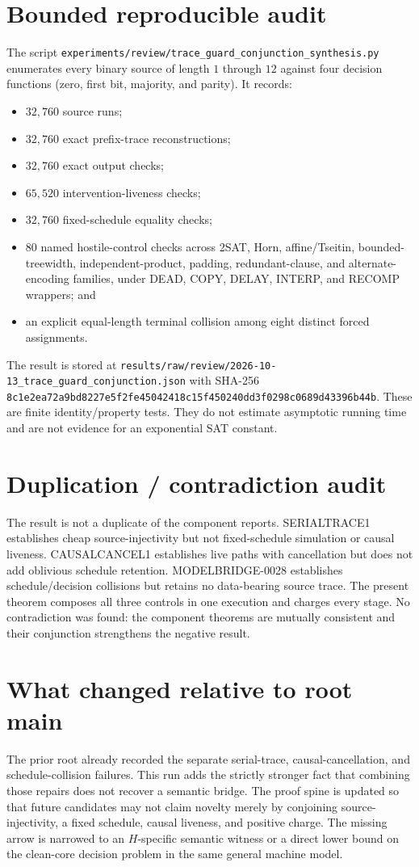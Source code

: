 \documentclass[11pt]{article}
\begin{document}
\section*{Bounded reproducible audit}
The script
\texttt{experiments/review/trace\_guard\_conjunction\_synthesis.py}
enumerates every binary source of length $1$ through $12$ against four
decision functions (zero, first bit, majority, and parity).  It records:
\begin{itemize}
\item $32{,}760$ source runs;
\item $32{,}760$ exact prefix-trace reconstructions;
\item $32{,}760$ exact output checks;
\item $65{,}520$ intervention-liveness checks;
\item $32{,}760$ fixed-schedule equality checks;
\item $80$ named hostile-control checks across 2SAT, Horn, affine/Tseitin,
bounded-treewidth, independent-product, padding, redundant-clause, and
alternate-encoding families, under DEAD, COPY, DELAY, INTERP, and RECOMP
wrappers; and
\item an explicit equal-length terminal collision among eight distinct forced
assignments.
\end{itemize}
The result is stored at
\texttt{results/raw/review/2026-10-13\_trace\_guard\_conjunction.json} with
SHA-256
\texttt{8c1e2ea72a9bd8227e5f2fe45042418c15f450240dd3f0298c0689d43396b44b}.
These are finite identity/property tests.  They do not estimate asymptotic
running time and are not evidence for an exponential SAT constant.

\section*{Duplication / contradiction audit}
The result is not a duplicate of the component reports.  \textsf{SERIALTRACE1}
establishes cheap source-injectivity but not fixed-schedule simulation or
causal liveness.  \textsf{CAUSALCANCEL1} establishes live paths with
cancellation but does not add oblivious schedule retention.  \textsf{MODELBRIDGE-0028}
establishes schedule/decision collisions but retains no data-bearing source
trace.  The present theorem composes all three controls in one execution and
charges every stage.  No contradiction was found: the component theorems are
mutually consistent and their conjunction strengthens the negative result.

\section*{What changed relative to root main}
The prior root already recorded the separate serial-trace,
causal-cancellation, and schedule-collision failures.  This run adds the
strictly stronger fact that combining those repairs does not recover a
semantic bridge.  The proof spine is updated so that future candidates may not
claim novelty merely by conjoining source-injectivity, a fixed schedule,
causal liveness, and positive charge.  The missing arrow is narrowed to an
$H$-specific semantic witness or a direct lower bound on the clean-core
decision problem in the same general machine model.
\end{document}
